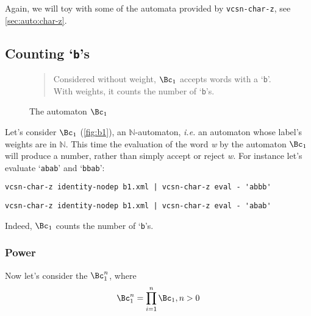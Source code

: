 \documentclass[a4paper]{report}
\newenvironment{legend}{%
  \begin{quote}%
    }{%
  \end{quote}%
}
\newcommand\command[1]{\texttt{#1}}
\newcommand\var[1]{{\ttfamily\itshape #1}}
\newcommand\samp[1]{`\texttt{#1}'}
\begin{document}
Again, we will toy with some of the automata provided by
\command{vcsn-char-z}, see \autoref{sec:auto:char-z}.

\subsection{Counting \samp{b}s}

\begin{figure}[tp] \centering
  \begin{legend}
    Considered without weight, $\Bc_1$ accepts words with a \samp{b}.
    With weights, it counts the number of \samp{b}s.
  \end{legend}
  \caption{The automaton $\Bc_1$}
  \label{fig:b1}
\end{figure}

Let's consider $\Bc_1$ (\autoref{fig:b1}), an
$\mathbb{N}$-automaton,
\textit{i.e.}  an automaton whose label's weights are in $\mathbb{N}$.
This time the evaluation of the word \var{w} by the automaton
$\Bc_1$ will produce a number, rather than simply accept or
reject \var{w}.  For instance let's evaluate \samp{abab} and
\samp{bbab}:

\begin{verbatim}
vcsn-char-z identity-nodep b1.xml | vcsn-char-z eval - 'abbb'
\end{verbatim}
\begin{verbatim}
vcsn-char-z identity-nodep b1.xml | vcsn-char-z eval - 'abab'
\end{verbatim}

\noindent
Indeed, $\Bc_1$ counts the number of \samp{b}s.

\subsubsection{Power}

Now let's consider the $\Bc_1^n$, where
\begin{displaymath}
  \Bc_1^n = \prod_{i=1}^n \Bc_1, n > 0
\end{displaymath}
\end{document}
